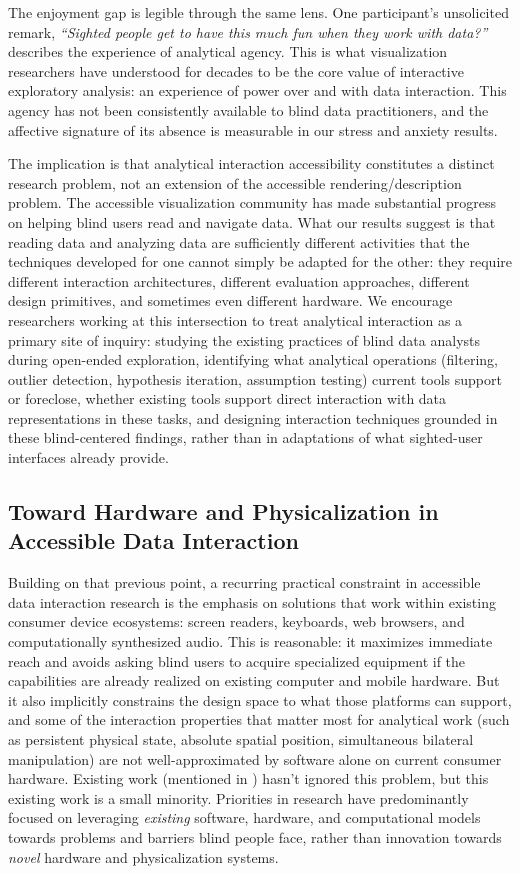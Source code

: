 \documentclass[12pt]{cmuthesis}
\begin{document}
The enjoyment gap is legible through the same lens. One participant's unsolicited remark, \textit{``Sighted people get to have this much fun when they work with data?''} describes the experience of analytical agency. This is what visualization researchers have understood for decades to be the core value of interactive exploratory analysis: an experience of power over and with data interaction. This agency has not been consistently available to blind data practitioners, and the affective signature of its absence is measurable in our stress and anxiety results.

The implication is that analytical interaction accessibility constitutes a distinct research problem, not an extension of the accessible rendering/description problem. The accessible visualization community has made substantial progress on helping blind users read and navigate data. What our results suggest is that reading data and analyzing data are sufficiently different activities that the techniques developed for one cannot simply be adapted for the other: they require different interaction architectures, different evaluation approaches, different design primitives, and sometimes even different hardware. We encourage researchers working at this intersection to treat analytical interaction as a primary site of inquiry: studying the existing practices of blind data analysts during open-ended exploration, identifying what analytical operations (filtering, outlier detection, hypothesis iteration, assumption testing) current tools support or foreclose, whether existing tools support direct interaction with data representations in these tasks, and designing interaction techniques grounded in these blind-centered findings, rather than in adaptations of what sighted-user interfaces already provide.


\subsection{Toward Hardware and Physicalization in Accessible Data Interaction}
\label{sec:imperative-2}


Building on that previous point, a recurring practical constraint in accessible data interaction research is the emphasis on solutions that work within existing consumer device ecosystems: screen readers, keyboards, web browsers, and computationally synthesized audio. This is reasonable: it maximizes immediate reach and avoids asking blind users to acquire specialized equipment if the capabilities are already realized on existing computer and mobile hardware. But it also implicitly constrains the design space to what those platforms can support, and some of the interaction properties that matter most for analytical work (such as persistent physical state, absolute spatial position, simultaneous bilateral manipulation) are not well-approximated by software alone on current consumer hardware. Existing work (mentioned in ) hasn't ignored this problem, but this existing work is a small minority. Priorities in research have predominantly focused on leveraging \textit{existing} software, hardware, and computational models towards problems and barriers blind people face, rather than innovation towards \textit{novel} hardware and physicalization systems.
\end{document}

